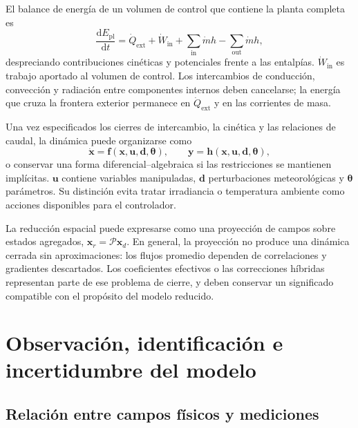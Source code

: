 El balance de energía de un volumen de control que contiene la planta completa es
\begin{equation}
\frac{\mathrm{d}E_{\mathrm{pl}}}{\mathrm{d}t}
=\dot Q_{\mathrm{ext}}+\dot W_{\mathrm{in}}
+\sum_{\mathrm{in}}\dot m h
-\sum_{\mathrm{out}}\dot m h,
\label{eq:balance_energia_recinto}
\end{equation}
despreciando contribuciones cinéticas y potenciales frente a las entalpías. $\dot W_{\mathrm{in}}$ es trabajo aportado al volumen de control. Los intercambios de conducción, convección y radiación entre componentes internos deben cancelarse; la energía que cruza la frontera exterior permanece en $\dot Q_{\mathrm{ext}}$ y en las corrientes de masa.

Una vez especificados los cierres de intercambio, la cinética y las relaciones de caudal, la dinámica puede organizarse como
\begin{equation}
\dot{\mathbf x}=\mathbf f(\mathbf x,\mathbf u,\mathbf d,\boldsymbol\theta),
\qquad
\mathbf y=\mathbf h(\mathbf x,\mathbf u,\mathbf d,\boldsymbol\theta),
\label{eq:modelo_general_control}
\end{equation}
o conservar una forma diferencial--algebraica si las restricciones se mantienen implícitas. $\mathbf u$ contiene variables manipuladas, $\mathbf d$ perturbaciones meteorológicas y $\boldsymbol\theta$ parámetros. Su distinción evita tratar irradiancia o temperatura ambiente como acciones disponibles para el controlador.

La reducción espacial puede expresarse como una proyección de campos sobre estados agregados, $\mathbf x_r=\mathcal P\mathbf x_d$. En general, la proyección no produce una dinámica cerrada sin aproximaciones: los flujos promedio dependen de correlaciones y gradientes descartados. Los coeficientes efectivos o las correcciones híbridas representan parte de ese problema de cierre, y deben conservar un significado compatible con el propósito del modelo reducido.

\section{Observación, identificación e incertidumbre del modelo}
\label{sec:observacion_validez}

\subsection{Relación entre campos físicos y mediciones}

